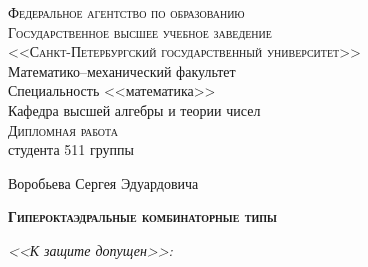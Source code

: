 
\thispagestyle{empty}

\begin{center}

        \textsc{Федеральное агентство по образованию}\\[0.2cm]

        \textsc{Государственное высшее учебное заведение \\
        <<Санкт-Петербургский государственный университет>>}\\[0.7cm]

        Математико--механический факультет \\[0.5cm]

        Специальность <<математика>>\\[0.7cm]

        Кафедра высшей алгебры и теории чисел\\[0.7cm]

        \textsc{Дипломная работа}\\[0.7cm]

		студента 511 группы
		
		Воробьева Сергея Эдуардовича\\[0.7cm]

        \begin{large}
                \textsc{\textbf{Гипероктаэдральные комбинаторные типы}}
        \end{large}

\end{center}

\vspace{0.7cm}

\textit{<<К защите допущен>>:}

